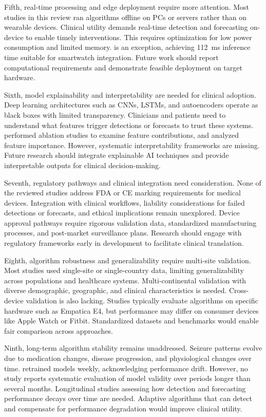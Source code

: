 Fifth, real-time processing and edge deployment require more attention. Most studies in this review ran algorithms offline on PCs or servers rather than on wearable devices. Clinical utility demands real-time detection and forecasting on-device to enable timely interventions. This requires optimization for low power consumption and limited memory. \textcite{spahrDeepLearningbasedDetection2025} is an exception, achieving 112~ms inference time suitable for smartwatch integration. Future work should report computational requirements and demonstrate feasible deployment on target hardware.

Sixth, model explainability and interpretability are needed for clinical adoption. Deep learning architectures such as CNNs, LSTMs, and autoencoders operate as black boxes with limited transparency. Clinicians and patients need to understand what features trigger detections or forecasts to trust these systems. \textcite{nasseriAmbulatorySeizureForecasting2021} performed ablation studies to examine feature contributions, and \textcite{reintjesECGBasedDetectionEpileptic2025} analyzed feature importance. However, systematic interpretability frameworks are missing. Future research should integrate explainable AI techniques and provide interpretable outputs for clinical decision-making.

Seventh, regulatory pathways and clinical integration need consideration. None of the reviewed studies address FDA or CE marking requirements for medical devices. Integration with clinical workflows, liability considerations for failed detections or forecasts, and ethical implications remain unexplored. Device approval pathways require rigorous validation data, standardized manufacturing processes, and post-market surveillance plans. Research should engage with regulatory frameworks early in development to facilitate clinical translation.

Eighth, algorithm robustness and generalizability require multi-site validation. Most studies used single-site or single-country data, limiting generalizability across populations and healthcare systems. Multi-continental validation with diverse demographic, geographic, and clinical characteristics is needed. Cross-device validation is also lacking. Studies typically evaluate algorithms on specific hardware such as Empatica E4, but performance may differ on consumer devices like Apple Watch or Fitbit. Standardized datasets and benchmarks would enable fair comparison across approaches.

Ninth, long-term algorithm stability remains unaddressed. Seizure patterns evolve due to medication changes, disease progression, and physiological changes over time. \textcite{stirlingForecastingSeizureLikelihood2021} retrained models weekly, acknowledging performance drift. However, no study reports systematic evaluation of model validity over periods longer than several months. Longitudinal studies assessing how detection and forecasting performance decays over time are needed. Adaptive algorithms that can detect and compensate for performance degradation would improve clinical utility.
